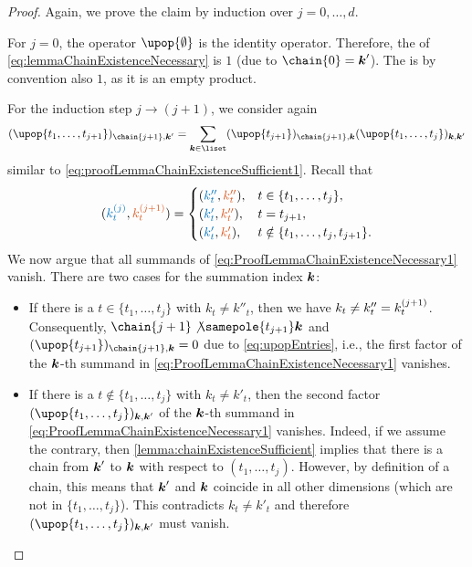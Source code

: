 \begin{proof}
  Again, we prove the claim by induction over $j = 0, \dotsc, d$.
  
  For $j = 0$, the operator $\upop{\emptyset}$ is the identity operator.
  Therefore, the \lhs of \eqref{eq:lemmaChainExistenceNecessary} is $1$
  (due to $\chain{0} = \*k'$).
  The \rhs is by convention also $1$, as it is an empty product.
  
  For the induction step $j \to (j+1)$, we consider again
  \begin{equation}
    \label{eq:ProofLemmaChainExistenceNecessary1}
    (\upop{t_1,\dotsc,t_{j+1}})_{\chain{j+1},\*k'}
    = \sum_{\*k \in \liset} (\upop{t_{j+1}})_{\chain{j+1},\*k}
    (\upop{t_1,\dotsc,t_j})_{\*k,\*k'}
  \end{equation}
  similar to \eqref{eq:proofLemmaChainExistenceSufficient1}.
  Recall that
  \begin{equation}
    (\textcolor{C0}{\chainuv{j}_t},
    \textcolor{C1}{\chainuv{j+1}_t})
    =
    \begin{cases}
      (\textcolor{C0}{k''_t}, \textcolor{C1}{k''_t}),&
      t \in \{t_1, \dotsc, t_j\},\\
      (\textcolor{C0}{k'_t}, \textcolor{C1}{k''_t}),&
      t = t_{j+1},\\
      (\textcolor{C0}{k'_t}, \textcolor{C1}{k'_t}),&
      t \notin \{t_1, \dotsc, t_j, t_{j+1}\}.
    \end{cases}
  \end{equation}
  We now argue that all summands of
  \eqref{eq:ProofLemmaChainExistenceNecessary1} vanish.
  There are two cases for the summation index ${\boldsymbol{k}}$:
  \begin{itemize}
    \item
    If there is a $t \in \{t_1, \dotsc, t_j\}$ with $k_t \not= k''_t$,
    then we have $k_t \not= k''_t = k^{(j+1)}_t$.
    Consequently, $\chain{j+1} \not\samepole{t_{j+1}} \*k$ and
    $(\upop{t_{j+1}})_{\chain{j+1},\*k} = 0$ due to \eqref{eq:upopEntries},
    i.e., the first factor of the ${\boldsymbol{k}}$-th summand in
    \eqref{eq:ProofLemmaChainExistenceNecessary1} vanishes.
    
    \item
    If there is a $t \notin \{t_1, \dotsc, t_j\}$ with $k_t \not= k'_t$,
    then the second factor $(\upop{t_1,\dotsc,t_j})_{\*k,\*k'}$
    of the ${\boldsymbol{k}}$-th summand in
    \eqref{eq:ProofLemmaChainExistenceNecessary1} vanishes.
    Indeed, if we assume the contrary,
    then \cref{lemma:chainExistenceSufficient} implies that there is
    a chain from ${\boldsymbol{k}}'$ to ${\boldsymbol{k}}$ with respect to $(t_1, \dotsc, t_j)$.
    However, by definition of a chain, this means that
    ${\boldsymbol{k}}'$ and ${\boldsymbol{k}}$ coincide in all other dimensions
    (which are not in $\{t_1, \dotsc, t_j\}$).
    This contradicts $k_t \not= k'_t$ and therefore
    $(\upop{t_1,\dotsc,t_j})_{\*k,\*k'}$ must vanish.
  \end{itemize}
  

\end{proof}
